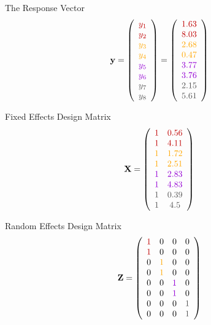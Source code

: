 \documentclass{beamer}
\begin{document}
\begin{frame}{The Response Vector}
\[
\mathbf{y} = \left( 
\begin{array}{c} 
\color{darkred}{y_1} \\ 
\color{darkred}{y_2} \\ 
\color{orange}{y_3} \\ 
\color{orange}{y_4} \\ 
\color{violet}{y_5} \\ 
\color{violet}{y_6} \\ 
\color{darkgray}{y_7} \\ 
\color{darkgray}{y_8} 
\end{array}\right) = \left( 
\begin{array}{c} 
\color{darkred}{1.63} \\ 
\color{darkred}{8.03} \\ 
\color{orange}{2.68} \\ 
\color{orange}{0.47} \\ 
\color{violet}{3.77} \\ 
\color{violet}{3.76} \\ 
\color{darkgray}{2.15} \\ 
\color{darkgray}{5.61} 
\end{array}\right)
\]
\end{frame}

\begin{frame}{Fixed Effects Design Matrix}
\[
\mathbf{X} = \left( 
\begin{array}{cc} 
\color{darkred}{1} & \color{darkred}{0.56} \\ 
\color{darkred}{1} & \color{darkred}{4.11} \\ 
\color{orange}{1} & \color{orange}{1.72} \\ 
\color{orange}{1} & \color{orange}{2.51} \\ 
\color{violet}{1} & \color{violet}{2.83} \\ 
\color{violet}{1} & \color{violet}{4.83} \\ 
\color{darkgray}{1} & \color{darkgray}{0.39} \\ 
\color{darkgray}{1} & \color{darkgray}{4.5} 
\end{array}\right)
\]
\end{frame}

\begin{frame}{Random Effects Design Matrix}
\[
\mathbf{Z} = \left( 
\begin{array}{cccc} 
\color{darkred}{1} & 0 & 0 & 0 \\ 
\color{darkred}{1} & 0 & 0 & 0 \\ 
0 & \color{orange}{1} & 0 & 0 \\ 
0 & \color{orange}{1} & 0 & 0 \\ 
0 & 0 & \color{violet}{1} & 0 \\ 
0 & 0 & \color{violet}{1} & 0 \\ 
0 & 0 & 0 & \color{darkgray}{1} \\ 
0 & 0 & 0 & \color{darkgray}{1} 
\end{array}\right)
\]
\end{frame}
\end{document}
